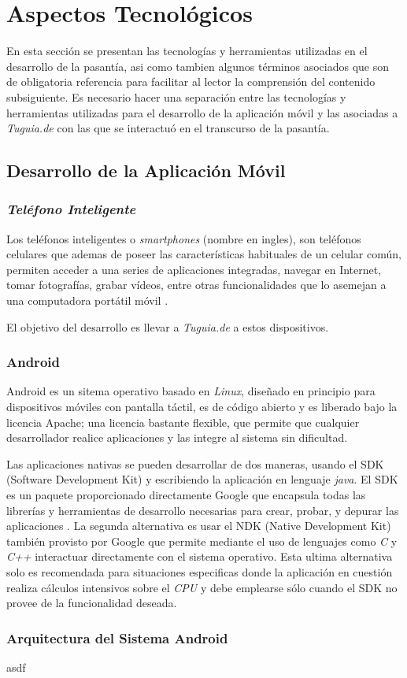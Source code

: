 \section{Aspectos Tecnológicos} \label{sect:aspectos_tecnologicos}

En esta sección se presentan las tecnologías y herramientas utilizadas en el desarrollo de la pasantía, asi como tambien algunos términos asociados que son de obligatoria referencia para facilitar al lector la comprensión del contenido subsiguiente. Es necesario hacer una separación entre las tecnologías y herramientas utilizadas para el desarrollo de la aplicación móvil y las asociadas a \textit{Tuguia.de} con las que se interactuó en el transcurso de la pasantía.

\subsection{Desarrollo de la Aplicación Móvil} \label{subsect:desarrollo_movil}

\subsubsection{\textit{Teléfono Inteligente}}

Los teléfonos inteligentes o \textit{smartphones} (nombre en ingles), son teléfonos celulares que ademas de poseer las características habituales de un celular común, permiten acceder a una series de aplicaciones integradas, navegar en Internet, tomar fotografías, grabar vídeos, entre otras funcionalidades que lo asemejan  a una computadora portátil móvil \cite{PCM}.

El objetivo del desarrollo es llevar a \textit{Tuguia.de} a estos dispositivos.

\subsubsection{Android}

Android es un sitema operativo basado en \textit{Linux}, diseñado en principio para dispositivos móviles con pantalla táctil, es de código abierto y es liberado bajo la licencia Apache; una licencia bastante flexible, que permite que cualquier desarrollador realice aplicaciones y las integre al sistema sin dificultad.

Las aplicaciones nativas se pueden desarrollar de dos maneras, usando el SDK (Software Development Kit) y escribiendo la aplicación en lenguaje \textit{java}. El SDK es un paquete proporcionado directamente Google que encapsula todas las librerías y herramientas de desarrollo necesarias para crear, probar, y depurar las aplicaciones \cite{ASDK}. La segunda alternativa es usar el NDK (Native Development Kit) también provisto por Google que permite mediante el uso de lenguajes como \textit{C} y \textit{C++} interactuar directamente con el sistema operativo. Esta ultima alternativa solo es recomendada para situaciones especificas donde la aplicación en cuestión realiza cálculos intensivos sobre el \textit{CPU} y debe emplearse sólo cuando el SDK no provee de la funcionalidad deseada\cite{ANDK}.

\subsubsection{Arquitectura del Sistema Android}


asdf